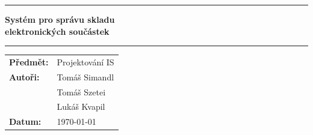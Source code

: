 \documentclass[12pt, a4paper]{report}
\begin{document}
\begin{titlepage}
  \centering
  \vspace*{2cm}

  {\rule{\linewidth}{1.5pt}}
  \vspace{0.5cm}

  {\Huge\bfseries
    Systém pro správu skladu\\[0.4em]
    elektronických součástek
  }

  \vspace{0.5cm}
  {\rule{\linewidth}{1.5pt}}

  \vfill

  \begin{tabular}{ll}
    \textbf{Předmět:}  & Projektování IS     \\[4pt]
    \textbf{Autoři:}   & Tomáš Simandl  \\[4pt]
                       & Tomáš Szetei    \\[4pt]
                       & Lukáš Kvapil   \\[4pt]
    \textbf{Datum:}    & \today                \\[4pt]
  \end{tabular}

\end{titlepage}

\tableofcontents
\newpage



\end{document}
